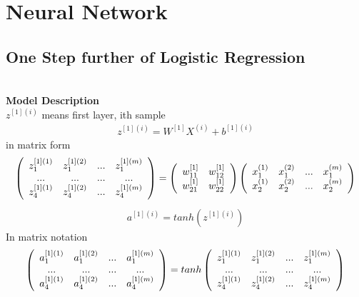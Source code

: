\documentclass[a4paper]{article}
\begin{document}
\section{Neural Network}
\subsection{One Step further of Logistic Regression}\\
{\bf Model Description}\\
$z^{[1](i)}$ means first layer, ith sample
\begin{align*}
	z^{[1](i)} = W^{[1]} X^{(i)} + b^{[1](i)}
\end{align*}
in matrix form
\begin{align*}
\left( \begin{array} {c c c c}
z_1^{[1](1)} & z_1^{[1](2)} & ... & z_1^{[1](m)} \\
... & ... & ... & ... \\
z_4^{[1](1)} & z_4^{[1](2)} & ... & z_4^{[1](m)} \\
\end{array} \right)
=\left( \begin{array} {c c}
w_{11}^{[1]} & w_{12}^{[1]}   \\
w_{21}^{[1]} & w_{22}^{[1]}   \\
\end{array} \right)
\left( \begin{array} {c c c c}
x_1^{(1)} & x_1^{(2)} & ... & x_1^{(m)} \\
x_2^{(1)} & x_2^{(2)} & ... & x_2^{(m)} \\
\end{array} \right)\\
\end{align*}
\begin{align*}
	a^{[1](i)} = tanh(z^{[1](i)})
\end{align*}
In matrix notation
\begin{align*}
\left( \begin{array} {c c c c}
a_1^{[1](1)} & a_1^{[1](2)} & ... & a_1^{[1](m)} \\
... & ... & ... & ... \\
a_4^{[1](1)} & a_4^{[1](2)} & ... & a_4^{[1](m)} \\
\end{array} \right)
=tanh \left( \begin{array} {c c c c}
z_1^{[1](1)} & z_1^{[1](2)} & ... & z_1^{[1](m)} \\
... & ... & ... & ... \\
z_4^{[1](1)} & z_4^{[1](2)} & ... & z_4^{[1](m)} \\
\end{array} \right)
\end{align*}
\end{document}

